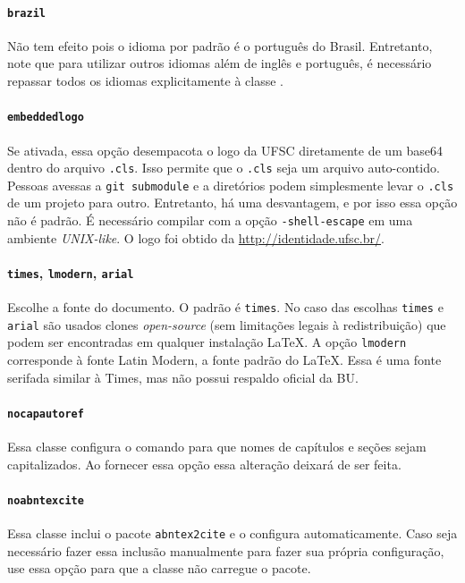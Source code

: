 \documentclass[embeddedlogo]{../ufsc-thesis-rn46-2019}
\begin{document}
\paragraph*{\texttt{brazil}} Não tem efeito pois o idioma por padrão é o
português do Brasil. Entretanto, note que para utilizar outros idiomas além de
inglês e português, é necessário repassar todos os idiomas explicitamente à
classe \abnTeX.

\paragraph*{\texttt{embeddedlogo}} Se ativada, essa opção desempacota o logo da
UFSC diretamente de um base64 dentro do arquivo \texttt{.cls}. Isso permite que
o \texttt{.cls} seja um arquivo auto-contido. Pessoas avessas a \texttt{git
submodule} e a diretórios podem simplesmente levar o \texttt{.cls} de um
projeto para outro. Entretanto, há uma desvantagem, e por isso essa opção não é
padrão. É necessário compilar com a opção \texttt{-shell-escape} em uma
ambiente \emph{UNIX-like}. O logo foi obtido da \href{página de identidade
visual da UFSC}{http://identidade.ufsc.br/}.

\paragraph*{\texttt{times}, \texttt{lmodern}, \texttt{arial}} Escolhe a fonte
do documento. O padrão é \texttt{times}. No caso das escolhas \texttt{times} e
\texttt{arial} são usados clones \emph{open-source} (sem limitações legais à
redistribuição) que podem ser encontradas em qualquer instalação \LaTeX. A
opção \texttt{lmodern} corresponde à fonte Latin Modern, a fonte padrão do
\LaTeX. Essa é uma fonte serifada similar à Times, mas não possui respaldo
oficial da BU.

\paragraph*{\texttt{nocapautoref}} Essa classe configura o comando
\mt{\autoref} para que nomes de capítulos e seções sejam capitalizados. Ao
fornecer essa opção essa alteração deixará de ser feita.

\paragraph*{\texttt{noabntexcite}} Essa classe inclui o pacote
\texttt{abntex2cite} e o configura automaticamente. Caso seja necessário fazer
essa inclusão manualmente para fazer sua própria configuração, use essa opção
para que a classe não carregue o pacote.
\end{document}
